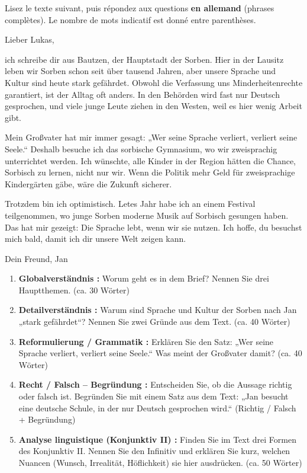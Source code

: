 \documentclass[11pt]{article}
\newcounter{popsec}
\newcounter{popsub}
\newcommand{\courssub}[1]{%
  \stepcounter{popsub}%
  \par\vspace{9pt}\noindent{\popxbold\fontsize{11.5}{13}\selectfont\color{popink}{\color{poporange}\thepopsec.\thepopsub}\hspace{6pt}#1}\par\nopagebreak\vspace{4pt}
}
\begin{document}
\courssub{Je me prépare au Bac}

\begin{exercice}
Lisez le texte suivant, puis répondez aux questions \textbf{en allemand} (phrases complètes). Le nombre de mots indicatif est donné entre parenthèses.

\begin{textebox}
Lieber Lukas,

ich schreibe dir aus Bautzen, der Hauptstadt der Sorben. Hier in der Lausitz leben wir Sorben schon seit über tausend Jahren, aber unsere Sprache und Kultur sind heute stark gefährdet. Obwohl die Verfassung uns Minderheitenrechte garantiert, ist der Alltag oft anders. In den Behörden wird fast nur Deutsch gesprochen, und viele junge Leute ziehen in den Westen, weil es hier wenig Arbeit gibt.

Mein Großvater hat mir immer gesagt: „Wer seine Sprache verliert, verliert seine Seele.“ Deshalb besuche ich das sorbische Gymnasium, wo wir zweisprachig unterrichtet werden. Ich wünschte, alle Kinder in der Region hätten die Chance, Sorbisch zu lernen, nicht nur wir. Wenn die Politik mehr Geld für zweisprachige Kindergärten gäbe, wäre die Zukunft sicherer.

Trotzdem bin ich optimistisch. Letes Jahr habe ich an einem Festival teilgenommen, wo junge Sorben moderne Musik auf Sorbisch gesungen haben. Das hat mir gezeigt: Die Sprache lebt, wenn wir sie nutzen. Ich hoffe, du besuchst mich bald, damit ich dir unsere Welt zeigen kann.

Dein Freund,
Jan
\end{textebox}

\begin{enumerate}
    \item \textbf{Globalverständnis :} Worum geht es in dem Brief? Nennen Sie drei Hauptthemen. (ca. 30 Wörter)
    \item \textbf{Detailverständnis :} Warum sind Sprache und Kultur der Sorben nach Jan „stark gefährdet“? Nennen Sie zwei Gründe aus dem Text. (ca. 40 Wörter)
    \item \textbf{Reformulierung / Grammatik :} Erklären Sie den Satz: „Wer seine Sprache verliert, verliert seine Seele.“ Was meint der Großvater damit? (ca. 40 Wörter)
    \item \textbf{Recht / Falsch -- Begründung :} Entscheiden Sie, ob die Aussage richtig oder falsch ist. Begründen Sie mit einem Satz aus dem Text: „Jan besucht eine deutsche Schule, in der nur Deutsch gesprochen wird.“ (Richtig / Falsch + Begründung)
    \item \textbf{Analyse linguistique (Konjunktiv II) :} Finden Sie im Text drei Formen des Konjunktiv II. Nennen Sie den Infinitiv und erklären Sie kurz, welchen Nuancen (Wunsch, Irrealität, Höflichkeit) sie hier ausdrücken. (ca. 50 Wörter)
\end{enumerate}
\end{exercice}
\end{document}
